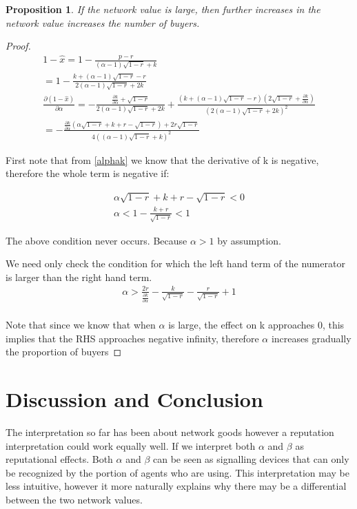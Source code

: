 \documentclass[11pt]{article}
\newtheorem{proposition}{Proposition}
\begin{document}
\begin{proposition}
If the network value is large, then further increases in the network value increases the number of buyers. 
\end{proposition}

\begin{proof}
\begin{align*}
1 - \hat{x}= 1 - \frac{p-r}{(\alpha - 1) \sqrt{1-r} +k} \\
= 1 - \frac{k+ (\alpha-1)\sqrt{ 1 -r }-r}{2(\alpha - 1) \sqrt{1-r} +2k} \\
\frac{\partial (1 - \hat{x})}{\partial \alpha}=  -\frac{ \frac{\partial k}{\partial \alpha}+ \sqrt{ 1 -r }}{2(\alpha - 1) \sqrt{1-r} +2k}+\frac{(k+ (\alpha-1)\sqrt{ 1 -r }-r) (2 \sqrt{1-r}+\frac{\partial k}{\partial \alpha})}{(2(\alpha - 1) \sqrt{1-r} +2k)^2} \\
=-\frac{\frac{\partial k}{\partial \alpha} \left(\alpha \sqrt{1-r}+k+r-\sqrt{1-r}\right)+2 r\sqrt{1-r} }{4 \left((\alpha-1) \sqrt{1-r}+k\right)^2}
\end{align*}

First note that from \ref{alphak} we know that the derivative of k is negative, therefore the whole term is negative if:

\begin{align*}
\alpha \sqrt{1-r}+k+r-\sqrt{1-r}<0 \\
\alpha <1-\frac{k+r}{\sqrt{1-r}}<1 
\end{align*}

The above condition never occurs. Because $\alpha>1$ by assumption. 

We need only check the condition for which the left hand term of the numerator is larger than the right hand term. 
\begin{align*}
\alpha>\frac{2 r}{\frac{\partial k}{\partial \alpha}}-\frac{k}{\sqrt{1-r}}-\frac{r}{\sqrt{1-r}}+1 \\
\end{align*}

Note that since we know that when $\alpha$ is large, the effect on k approaches 0, this implies that the RHS approaches negative infinity, therefore $\alpha$ increases gradually the proportion of buyers
\end{proof}

\section{Discussion and Conclusion}
The interpretation so far has been about network goods however a reputation interpretation could work equally well. If we interpret both $\alpha$ and $\beta$ as reputational effects. Both $\alpha$ and $\beta$ can be seen as signalling devices that can only be recognized by the portion of agents who are using. This interpretation may be less intuitive, however it more naturally explains why there may be a differential between the two network values.
\end{document}
